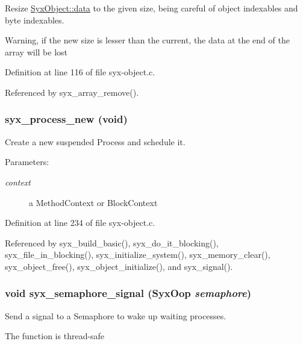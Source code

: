 Resize \hyperlink{struct_syx_object_1613092e651dd77e4a0c1d0a1ec413cb}{SyxObject::data} to the given size, being careful of object indexables and byte indexables.

Warning, if the new size is lesser than the current, the data at the end of the array will be lost 

Definition at line 116 of file syx-object.c.

Referenced by syx\_\-array\_\-remove().\hypertarget{syx-object_8c_f6ad7102f21107a9f0de770ff84e1165}{
\subsubsection{ syx\_\-process\_\-new (void)}}
\label{syx-object_8c_f6ad7102f21107a9f0de770ff84e1165}


Create a new suspended Process and schedule it.

\begin{Desc}
\item[Parameters:]
\begin{description}
\item[{\em context}]a MethodContext or BlockContext \end{description}
\end{Desc}


Definition at line 234 of file syx-object.c.

Referenced by syx\_\-build\_\-basic(), syx\_\-do\_\-it\_\-blocking(), syx\_\-file\_\-in\_\-blocking(), syx\_\-initialize\_\-system(), syx\_\-memory\_\-clear(), syx\_\-object\_\-free(), syx\_\-object\_\-initialize(), and syx\_\-signal().\hypertarget{syx-object_8c_eb6e7d880d0aa1250eb4ad3f0b55cb11}{
\subsubsection{\setlength{\rightskip}{0pt plus 5cm}void syx\_\-semaphore\_\-signal ({\bf SyxOop} {\em semaphore})}}
\label{syx-object_8c_eb6e7d880d0aa1250eb4ad3f0b55cb11}


Send a signal to a Semaphore to wake up waiting processes.

The function is thread-safe 

